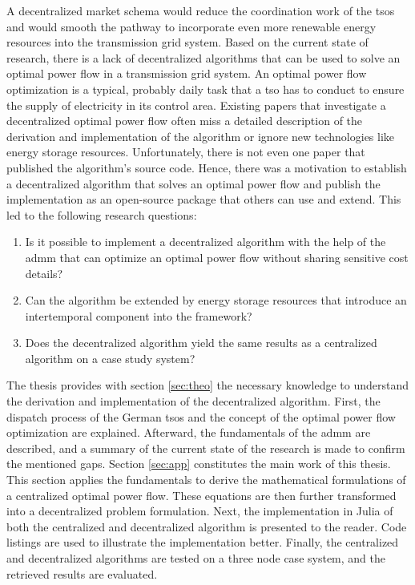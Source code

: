A decentralized market schema would reduce the coordination work of the \glspl{tso} and would smooth the pathway to incorporate even more renewable energy resources into the transmission grid system. Based on the current state of research, there is a lack of decentralized algorithms that can be used to solve an optimal power flow in a transmission grid system. An optimal power flow optimization is a typical, probably daily task that a \gls{tso} has to conduct to ensure the supply of electricity in its control area. Existing papers that investigate a decentralized optimal power flow often miss a detailed description of the derivation and implementation of the algorithm or ignore new technologies like energy storage resources. Unfortunately, there is not even one paper that published the algorithm's source code. Hence, there was a motivation to establish a decentralized algorithm that solves an optimal power flow and publish the implementation as an open-source package that others can use and extend. This led to the following research questions:

\begin{enumerate}
	\item Is it possible to implement a decentralized algorithm with the help of the \gls{admm} that can optimize an optimal power flow without sharing sensitive cost details?
	\item Can the algorithm be extended by energy storage resources that introduce an intertemporal component into the framework?
	\item Does the decentralized algorithm yield the same results as a centralized algorithm on a case study system?
\end{enumerate}

The thesis provides with section \ref{sec:theo} the necessary knowledge to understand the derivation and implementation of the decentralized algorithm. First, the dispatch process of the German \glspl{tso} and the concept of the optimal power flow optimization are explained. Afterward, the fundamentals of the \gls{admm} are described, and a summary of the current state of the research is made to confirm the mentioned gaps. Section \ref{sec:app} constitutes the main work of this thesis. This section applies the fundamentals to derive the mathematical formulations of a centralized optimal power flow. These equations are then further transformed into a decentralized problem formulation. Next, the implementation in Julia of both the centralized and decentralized algorithm is presented to the reader. Code listings are used to illustrate the implementation better. Finally, the centralized and decentralized algorithms are tested on a three node case system, and the retrieved results are evaluated.



